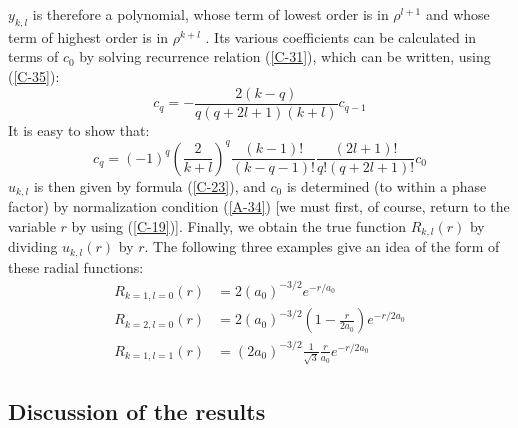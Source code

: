 $y_{k,l}$ is therefore a polynomial, whose term of lowest order is in $\rho^{l+1}$ and whose term of highest order is in $\rho^{k+l}$ . Its various coefficients can be calculated in terms of $c_0$ by solving recurrence relation (\ref{C-31}), which can be written, using (\ref{C-35}):
\begin{equation}\label{C-37}
	c_q=-\frac{2(k-q)}{q(q+2l+1)(k+l)}c_{q-1}
\end{equation}
It is easy to show that:
\begin{equation}\label{C-38}
	c_q=(-1)^q\left(\frac{2}{k+l}\right)^q\frac{(k-1)!}{(k-q-1)!}\frac{(2l+1)!}{q!(q+2l+1)!}c_0
\end{equation}
$u_{k,l}$ is then given by formula (\ref{C-23}), and $c_0$ is determined (to within a phase factor) by normalization condition (\ref{A-34}) [we must first, of course, return to the variable $r$ by using (\ref{C-19})]. Finally, we obtain the true function $R_{k,l}(r)$ by dividing $u_{k,l}(r)$ by $r$. The following three examples give an idea of the form of these radial functions:
\begin{align}
	\label{C-39a}R_{k=1,l=0}(r)&=2(a_0)^{-3/2}e^{-r/a_0}\\
	\label{C-39b}R_{k=2,l=0}(r)&=2(a_0)^{-3/2}\left(1-\frac{r}{2a_0}\right)e^{-r/2a_0}\\
	R_{k=1,l=1}(r)&=(2a_0)^{-3/2}\frac{1}{\sqrt{3}}\frac{r}{a_0}e^{-r/2a_0}\label{C_39c}
\end{align}

\subsection{Discussion of the results}\label{sec:C-4}


































